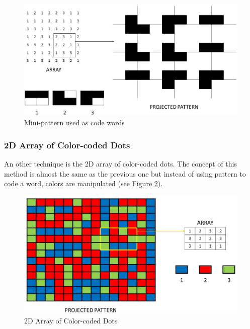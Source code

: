 \begin{figure}[h!]
  \centerline{\includegraphics[scale=0.48]{fig/codeWords.jpg}}
  \caption{Mini-pattern used as code words}
  \label{fig:codeWords}
\end{figure}





\subsubsection{2D Array of Color-coded Dots}

An other technique is the 2D array of color-coded dots. The concept of this method is almost the same as the previous one but instead of using pattern to code a word, colors are manipulated (see Figure \ref{fig:color-coded}).

\begin{figure}[h]
  \centerline{\includegraphics[scale=0.5]{fig/color-coded.jpg}}
  \caption{2D Array of Color-coded Dots}
  \label{fig:color-coded}
\end{figure}
